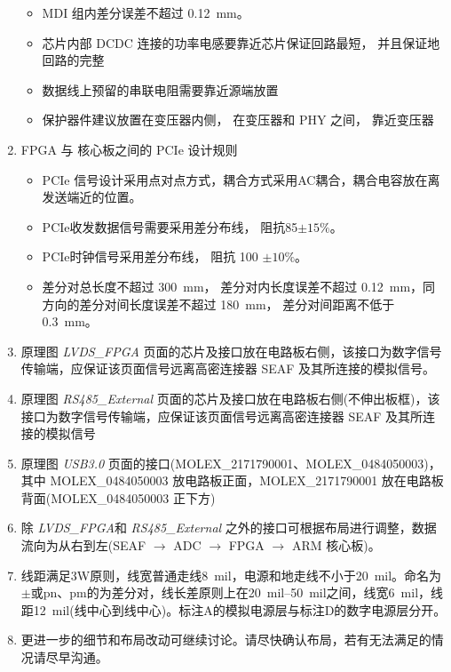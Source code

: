 \begin{enumerate}
\begin{itemize}
    \item MDI 组内差分误差不超过 \SI{0.12}{mm}。
    \item 芯片内部 DCDC 连接的功率电感要靠近芯片保证回路最短， 并且保证地回路的完整
    \item 数据线上预留的串联电阻需要靠近源端放置
    \item 保护器件建议放置在变压器内侧， 在变压器和 PHY 之间， 靠近变压器
  \end{itemize}
  \item FPGA 与 核心板之间的 PCIe 设计规则
  \begin{itemize}
    \item PCIe 信号设计采用点对点方式，耦合方式采用AC耦合，耦合电容放在离发送端近的位置。
    \item PCIe收发数据信号需要采用差分布线， 阻抗\SI{85}{\upOmega}$\pm 15\%$。
    \item PCIe时钟信号采用差分布线， 阻抗 \SI{100}{\upOmega} $\pm 10\%$。
    \item 差分对总长度不超过 \SI{300}{mm}， 差分对内长度误差不超过 \SI{0.12}{mm}，同方向的差分对间长度误差不超过 \SI{180}{mm}， 差分对间距离不低于\SI{0.3}{mm}。
  \end{itemize}
  \item 原理图 \emph{LVDS\_FPGA} 页面的芯片及接口放在电路板右侧，该接口为数字信号传输端，应保证该页面信号远离高密连接器 SEAF 及其所连接的模拟信号。
  \item 原理图 \emph{RS485\_External} 页面的芯片及接口放在电路板右侧(不伸出板框)，该接口为数字信号传输端，应保证该页面信号远离高密连接器 SEAF 及其所连接的模拟信号
  \item 原理图 \emph{USB3.0} 页面的接口(MOLEX\_2171790001、MOLEX\_0484050003)，其中 MOLEX\_0484050003 放电路板正面，MOLEX\_2171790001 放在电路板背面(MOLEX\_0484050003 正下方)
  \item 除 \emph{LVDS\_FPGA}和 \emph{RS485\_External} 之外的接口可根据布局进行调整，数据流向为从右到左(SEAF $\rightarrow$ ADC $\rightarrow$ FPGA $\rightarrow$ ARM 核心板)。
  \item 线距满足3W原则，线宽普通走线\SI{8}{mil}，电源和地走线不小于\SI{20}{mil}。命名为$\pm$或pn、pm的为差分对，线长差原则上在\SIrange{20}{50}{mil}之间，线宽\SI{6}{mil}，线距\SI{12}{mil}(线中心到线中心)。标注A的模拟电源层与标注D的数字电源层分开。
  \item 更进一步的细节和布局改动可继续讨论。请尽快确认布局，若有无法满足的情况请尽早沟通。
\end{enumerate}